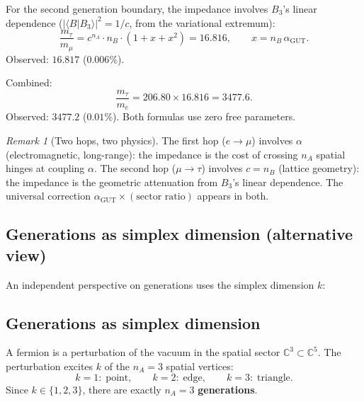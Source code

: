 \documentclass[12pt]{article}
\theoremstyle{remark}
\newtheorem{remark}[theorem]{Remark}
\theoremstyle{definition}
\begin{document}
For the second generation boundary, the impedance involves $B_3$'s linear dependence ($|\langle B|B_3\rangle|^2 = 1/c$, from the variational extremum):
\begin{equation}
\label{eq:tau_mu}
\boxed{\frac{m_\tau}{m_\mu} = c^{n_A}\cdot n_B \cdot \left(1 + x + x^2\right) = 16.816, \qquad x = n_B\,\alpha_\mathrm{GUT}.}
\end{equation}
Observed: $16.817$ ($0.006\%$).

Combined:
\begin{equation}
\label{eq:tau_e}
\frac{m_\tau}{m_e} = 206.80 \times 16.816 = 3477.6.
\end{equation}
Observed: $3477.2$ ($0.01\%$).  Both formulas use zero free parameters.

\begin{remark}[Two hops, two physics]
The first hop ($e \to \mu$) involves $\alpha$ (electromagnetic, long-range): the impedance is the cost of crossing $n_A$ spatial hinges at coupling $\alpha$.  The second hop ($\mu \to \tau$) involves $c = n_B$ (lattice geometry): the impedance is the geometric attenuation from $B_3$'s linear dependence.  The universal correction $\alpha_\mathrm{GUT} \times (\text{sector ratio})$ appears in both.
\end{remark}

\subsection{Generations as simplex dimension (alternative view)}
\label{sec:gen_alt}

An independent perspective on generations uses the simplex dimension $k$:

\subsection{Generations as simplex dimension}

A fermion is a perturbation of the vacuum in the spatial sector $\mathbb{C}^3 \subset \mathbb{C}^5$. The perturbation excites $k$ of the $n_A = 3$ spatial vertices:
\begin{equation}
k = 1:\;\text{point}, \qquad k = 2:\;\text{edge}, \qquad k = 3:\;\text{triangle}.
\end{equation}
Since $k \in \{1, 2, 3\}$, there are exactly $n_A = 3$ \textbf{generations}.
\end{document}
